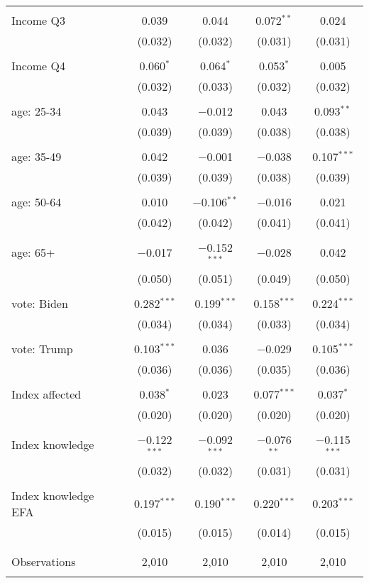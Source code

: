 \begin{tabular}{@{\extracolsep{5pt}}lcccc}
  & & & & \\ 
 Income Q3 & 0.039 & 0.044 & 0.072$^{**}$ & 0.024 \\ 
  & (0.032) & (0.032) & (0.031) & (0.031) \\ 
  & & & & \\ 
 Income Q4 & 0.060$^{*}$ & 0.064$^{*}$ & 0.053$^{*}$ & 0.005 \\ 
  & (0.032) & (0.033) & (0.032) & (0.032) \\ 
  & & & & \\ 
 age: 25-34 & 0.043 & $-$0.012 & 0.043 & 0.093$^{**}$ \\ 
  & (0.039) & (0.039) & (0.038) & (0.038) \\ 
  & & & & \\ 
 age: 35-49 & 0.042 & $-$0.001 & $-$0.038 & 0.107$^{***}$ \\ 
  & (0.039) & (0.039) & (0.038) & (0.039) \\ 
  & & & & \\ 
 age: 50-64 & 0.010 & $-$0.106$^{**}$ & $-$0.016 & 0.021 \\ 
  & (0.042) & (0.042) & (0.041) & (0.041) \\ 
  & & & & \\ 
 age: 65+ & $-$0.017 & $-$0.152$^{***}$ & $-$0.028 & 0.042 \\ 
  & (0.050) & (0.051) & (0.049) & (0.050) \\ 
  & & & & \\ 
 vote: Biden & 0.282$^{***}$ & 0.199$^{***}$ & 0.158$^{***}$ & 0.224$^{***}$ \\ 
  & (0.034) & (0.034) & (0.033) & (0.034) \\ 
  & & & & \\ 
 vote: Trump & 0.103$^{***}$ & 0.036 & $-$0.029 & 0.105$^{***}$ \\ 
  & (0.036) & (0.036) & (0.035) & (0.036) \\ 
  & & & & \\ 
 Index affected & 0.038$^{*}$ & 0.023 & 0.077$^{***}$ & 0.037$^{*}$ \\ 
  & (0.020) & (0.020) & (0.020) & (0.020) \\ 
  & & & & \\ 
 Index knowledge & $-$0.122$^{***}$ & $-$0.092$^{***}$ & $-$0.076$^{**}$ & $-$0.115$^{***}$ \\ 
  & (0.032) & (0.032) & (0.031) & (0.031) \\ 
  & & & & \\ 
 Index knowledge EFA & 0.197$^{***}$ & 0.190$^{***}$ & 0.220$^{***}$ & 0.203$^{***}$ \\ 
  & (0.015) & (0.015) & (0.014) & (0.015) \\ 
  & & & & \\ 
\hline \\[-1.8ex] 

Observations & 2,010 & 2,010 & 2,010 & 2,010 \\ 
\hline 
\hline \\[-1.8ex] 
\end{tabular} 